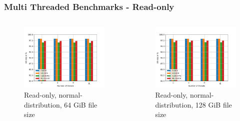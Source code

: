 \documentclass[
	aspectratio=169,
	compress,
]{beamer}
\newcommand{\navframetitle}[1]{\frametitle{#1\hfill{\footnotesize\lastsection{}}}}
\begin{document}
\begin{frame}[fragile]
	\navframetitle{Multi Threaded Benchmarks - Read-only}

	\begin{columns}
		\begin{column}{0.5\textwidth}
			\begin{figure}[ht]
    			\centering
    			\includegraphics[width=\textwidth]{multi_64_gb_randread_normal.jpg}
        		\caption{Read-only, normal-distribution, 64 GiB file size}
			\end{figure}
		\end{column}
		\begin{column}{0.5\textwidth}
			\begin{figure}[ht]
    			\centering
    			\includegraphics[width=\textwidth]{multi_128_gb_randread_normal.jpg}
        		\caption{Read-only, normal-distribution, 128 GiB file size}
			\end{figure}			
		\end{column}
	\end{columns}
\end{frame}
\end{document}
